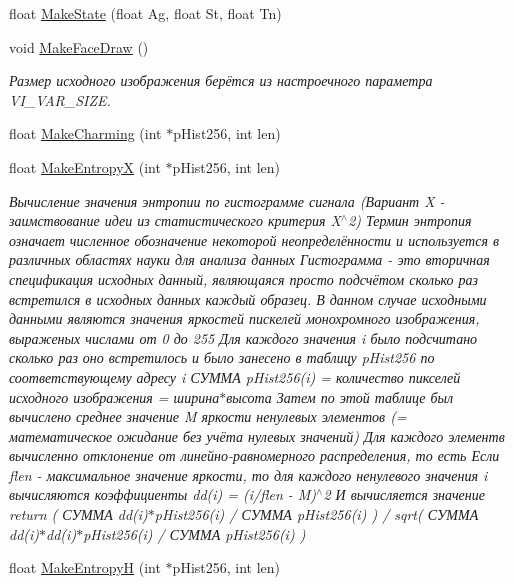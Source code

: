 \begin{DoxyCompactItemize}
float \hyperlink{class_c_v_i_engine_base_a835724aef2b6afbc88d5db31e8a13a08}{Make\+State} (float Ag, float St, float Tn)
\item 
void \hyperlink{class_c_v_i_engine_base_a18c5dc58d55a37295b3dd4c451fb86fc}{Make\+Face\+Draw} ()
\begin{DoxyCompactList}\small\item\em Размер исходного изображения берётся из настроечного параметра V\+I\+\_\+\+V\+A\+R\+\_\+\+S\+I\+Z\+E. \end{DoxyCompactList}\item 
float \hyperlink{class_c_v_i_engine_base_a784d5489bb89efa567e207d3539de0da}{Make\+Charming} (int $\ast$p\+Hist256, int len)
\item 
float \hyperlink{class_c_v_i_engine_base_a2617136f50ae63442e88809037ab9ff0}{Make\+Entropy\+X} (int $\ast$p\+Hist256, int len)
\begin{DoxyCompactList}\small\item\em Вычисление значения энтропии по гистограмме сигнала (Вариант X -\/ заимствование идеи из статистического критерия X$^\wedge$2) Термин энтропия означает численное обозначение некоторой неопределённости и используется в различных областях науки для анализа данных Гистограмма -\/ это вторичная спецификация исходных данный, являющаяся просто подсчётом сколько раз встретился в исходных данных каждый образец. В данном случае исходными данными являются значения яркостей пискелей монохромного изображения, выраженых числами от 0 до 255 Для каждого значения i было подсчитано сколько раз оно встретилось и было занесено в таблицу p\+Hist256 по соответствующему адресу i СУММА p\+Hist256(i) = количество пикселей исходного изображения = ширина$\ast$высота Затем по этой таблице был вычислено среднее значение M яркости ненулевых элементов (= математическое ожидание без учёта нулевых значений) Для каждого элементв вычисленно отклонение от линейно-\/равномерного распределения, то есть Если flen -\/ максимальное значение яркости, то для каждого ненулевого значения i вычисляются коэффициенты dd(i) = (i/flen -\/ M)$^\wedge$2 И вычисляется значение return ( СУММА dd(i)$\ast$p\+Hist256(i) / СУММА p\+Hist256(i) ) / sqrt( СУММА dd(i)$\ast$dd(i)$\ast$p\+Hist256(i) / СУММА p\+Hist256(i) ) \end{DoxyCompactList}\item 
float \hyperlink{class_c_v_i_engine_base_a4893abd93ae9de7f3913f24c872b23f8}{Make\+Entropy\+H} (int $\ast$p\+Hist256, int len)

\end{DoxyCompactItemize}
